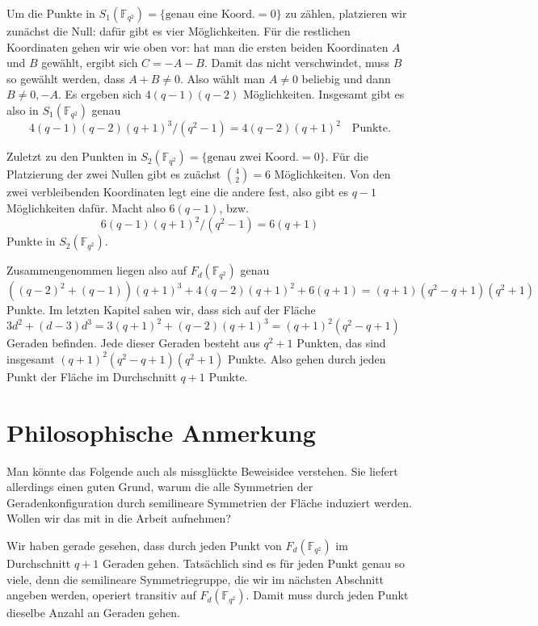 Um die Punkte in $S_1(\mathbb F_{q^2}) = \{\text{genau eine Koord.}= 0\}$ zu zählen, platzieren wir zunächst die Null: dafür gibt es vier Möglichkeiten. Für die restlichen Koordinaten gehen wir wie oben vor: hat man die ersten beiden Koordinaten $A$ und $B$ gewählt, ergibt sich $C=-A-B$. Damit das nicht verschwindet, muss $B$ so gewählt werden, dass $A+B \neq 0$. Also wählt man $A \neq 0$ beliebig und dann $B \neq 0, -A$. Es ergeben sich $4(q-1)(q-2)$ Möglichkeiten. Insgesamt gibt es also in $S_1(\mathbb F_{q^2})$ genau
\begin{equation}
4(q-1)(q-2)(q+1)^3/(q^2-1) = 4(q-2)(q+1)^2 \quad\text{Punkte.}
\end{equation}

Zuletzt zu den Punkten in $S_2(\mathbb F_{q^2}) = \{\text{genau zwei Koord.}= 0\}$. Für die Platzierung der zwei Nullen gibt es zuächst $\binom 4 2 = 6$ Möglichkeiten. Von den zwei verbleibenden Koordinaten legt eine die andere fest, also gibt es $q-1$ Möglichkeiten dafür. Macht also $6(q-1)$, bzw.
\begin{equation}
6(q-1)(q+1)^2/(q^2-1) = 6(q+1)
\end{equation}
Punkte in $S_2(\mathbb F_{q^2})$.

Zusammengenommen liegen also auf $F_d(\mathbb F_{q^2})$ genau
\begin{equation}
((q-2)^2+(q-1))(q+1)^3 + 4(q-2)(q+1)^2 + 6(q+1) = (q+1)(q^2-q+1)(q^2+1)
\end{equation}
Punkte. Im letzten Kapitel sahen wir, dass sich auf der Fläche $3d^2 + (d-3)d^3 = 3(q+1)^2 + (q-2)(q+1)^3 = (q+1)^2(q^2-q+1)$ Geraden befinden. Jede dieser Geraden besteht aus $q^2+1$ Punkten, das sind insgesamt $(q+1)^2(q^2-q+1)(q^2+1)$ Punkte. Also gehen durch jeden Punkt der Fläche im Durchschnitt $q+1$ Punkte.

\section{Philosophische Anmerkung}
Man könnte das Folgende auch als missglückte Beweisidee verstehen. Sie liefert allerdings einen guten Grund, warum die alle Symmetrien der Geradenkonfiguration durch semilineare Symmetrien der Fläche induziert werden. \note Wollen wir das mit in die Arbeit aufnehmen?

Wir haben gerade gesehen, dass durch jeden Punkt von $F_d(\mathbb F_{q^2})$ im Durchschnitt $q+1$ Geraden gehen. Tatsächlich sind es für jeden Punkt genau so viele, denn die semilineare Symmetriegruppe, die wir im nächsten Abschnitt angeben werden, operiert transitiv auf $F_d(\mathbb F_{q^2})$. Damit muss durch jeden Punkt dieselbe Anzahl an Geraden gehen.

